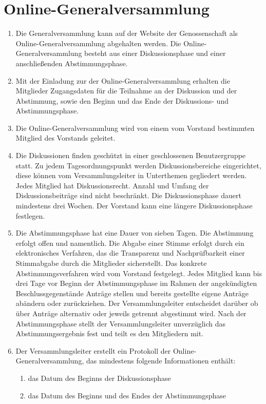 \documentclass[a4paper, 12pt]{scrartcl}
\begin{document}
\section{Online-Generalversammlung}
\begin{enumerate}
  \item Die Generalversammlung kann auf der Website der Genossenschaft als Online-Generalversammlung abgehalten werden. Die Online-Generalversammlung besteht aus einer Diskussionsphase und einer anschließenden Abstimmungsphase.
  \item Mit der Einladung zur der Online-Generalversammlung erhalten die Mitglieder Zugangsdaten für die Teilnahme an der Diskussion und der Abstimmung, sowie den Beginn und das Ende der Diskussions- und Abstimmungsphase.
  \item Die Online-Generalversammlung wird von einem vom Vorstand bestimmten Mitglied des Vorstands geleitet.
  \item Die Diskussionen finden geschützt in einer geschlossenen Benutzergruppe statt. Zu jedem Tagesordnungspunkt werden Diskussionsbereiche eingerichtet, diese können vom Versammlungsleiter in Unterthemen gegliedert werden. Jedes Mitglied hat Diskussionsrecht. Anzahl und Umfang der Diskussionsbeiträge sind nicht beschränkt. Die Diskussionsphase dauert mindestens drei Wochen. Der Vorstand kann eine längere Diskussionsphase festlegen.
  \item Die Abstimmungsphase hat eine Dauer von sieben Tagen. Die Abstimmung erfolgt offen und namentlich. Die Abgabe einer Stimme erfolgt durch ein elektronisches Verfahren, das die Transparenz und Nachprüfbarkeit einer Stimmabgabe durch die Mitglieder sicherstellt. Das konkrete Abstimmungsverfahren wird vom Vorstand festgelegt. Jedes Mitglied kann bis drei Tage vor Beginn der Abstimmungsphase im Rahmen der angekündigten Beschlussgegenstände Anträge stellen und bereits gestellte eigene Anträge abändern oder zurückziehen. Der Versammlungsleiter entscheidet darüber ob über Anträge alternativ oder jeweils getrennt abgestimmt wird. Nach der Abstimmungsphase stellt der Versammlungsleiter unverzüglich das Abstimmungsergebnis fest und teilt es den Mitgliedern mit.
  \item Der Versammlungsleiter erstellt ein Protokoll der Online-Generalversammlung, das mindestens folgende Informationen enthält:
  \begin{enumerate}
    \item das Datum des Beginns der Diskussionsphase
    \item das Datum des Beginns und des Endes der Abstimmungsphase

\end{enumerate}
\end{enumerate}
\end{document}

